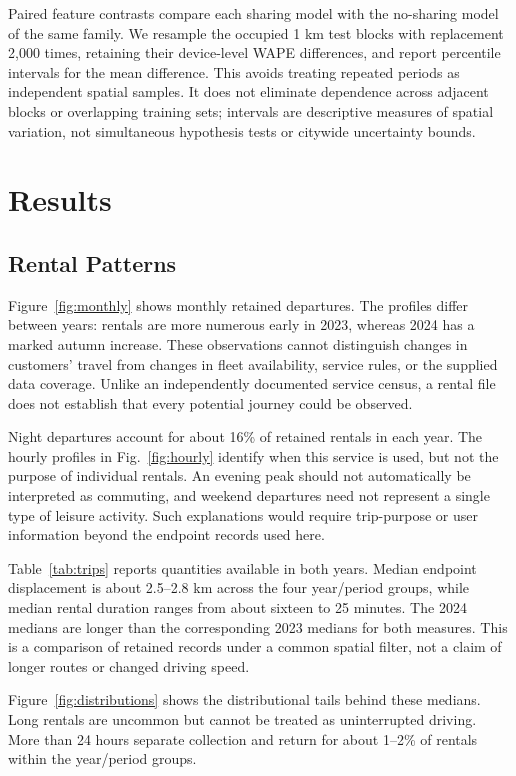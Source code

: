 \documentclass{interact}
\begin{document}
Paired feature contrasts compare each sharing model with the no-sharing model of the same family. We resample the occupied 1 km test blocks with replacement 2,000 times, retaining their device-level WAPE differences, and report percentile intervals for the mean difference. This avoids treating repeated periods as independent spatial samples. It does not eliminate dependence across adjacent blocks or overlapping training sets; intervals are descriptive measures of spatial variation, not simultaneous hypothesis tests or citywide uncertainty bounds.

\section{Results}
\label{sec:results}
\subsection{Rental Patterns}
\label{sec:rental-results}
Figure~\ref{fig:monthly} shows monthly retained departures. The profiles differ between years: rentals are more numerous early in 2023, whereas 2024 has a marked autumn increase. These observations cannot distinguish changes in customers' travel from changes in fleet availability, service rules, or the supplied data coverage. Unlike an independently documented service census, a rental file does not establish that every potential journey could be observed.

Night departures account for about 16\%{} of retained rentals in each year. The hourly profiles in Fig.~\ref{fig:hourly} identify when this service is used, but not the purpose of individual rentals. An evening peak should not automatically be interpreted as commuting, and weekend departures need not represent a single type of leisure activity. Such explanations would require trip-purpose or user information beyond the endpoint records used here.

Table~\ref{tab:trips} reports quantities available in both years. Median endpoint displacement is about 2.5--2.8 km across the four year/period groups, while median rental duration ranges from about sixteen to 25 minutes. The 2024 medians are longer than the corresponding 2023 medians for both measures. This is a comparison of retained records under a common spatial filter, not a claim of longer routes or changed driving speed.

Figure~\ref{fig:distributions} shows the distributional tails behind these medians. Long rentals are uncommon but cannot be treated as uninterrupted driving. More than 24 hours separate collection and return for about 1--2\%{} of rentals within the year/period groups.
\end{document}
